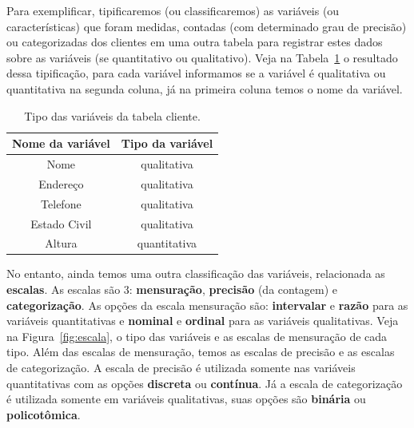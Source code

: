 \documentclass[a4paper,12pt]{book}
\begin{document}
Para exemplificar, tipificaremos (ou classificaremos) as variáveis (ou  características) que foram medidas, contadas (com determinado grau de precisão) ou categorizadas dos clientes em uma outra tabela para registrar estes dados sobre as variáveis (se quantitativo ou qualitativo). Veja na Tabela~\ref{tbl:clienteclassificacao} o resultado dessa tipificação, para cada variável informamos se a variável é qualitativa ou quantitativa na segunda coluna, já na primeira coluna temos o nome da variável.

\begin{table}
	\centering
	\caption{Tipo das variáveis da tabela cliente.}
	\begin{tabular}{|c|c|}
		\hline
		\textbf{Nome da variável} &\textbf{Tipo da variável} \\
		\hline
		Nome & qualitativa \\
		\hline
		Endereço & qualitativa \\
		\hline
		Telefone & qualitativa \\
		\hline
		Estado Civil & qualitativa \\
		\hline
		Altura & quantitativa \\
		\hline
	\end{tabular}
	\label{tbl:clienteclassificacao}
\end{table}

No entanto, ainda temos uma outra classificação das variáveis, relacionada as \textbf{escalas}. As escalas são 3: \textbf{mensuração}, \textbf{precisão} (da contagem) e \textbf{categorização}. As opções da escala mensuração são: \textbf{intervalar} e \textbf{razão} para as variáveis quantitativas e \textbf{nominal} e \textbf{ordinal} para as variáveis qualitativas. Veja na Figura~\ref{fig:escala}, o tipo das variáveis e as escalas de mensuração de cada tipo. Além das escalas de mensuração, temos as escalas de precisão e as escalas de categorização. A escala de precisão é utilizada somente nas variáveis quantitativas com as opções \textbf{discreta} ou \textbf{contínua}. Já a escala de categorização é utilizada somente em variáveis qualitativas, suas opções são \textbf{binária} ou \textbf{policotômica}.
\end{document}
